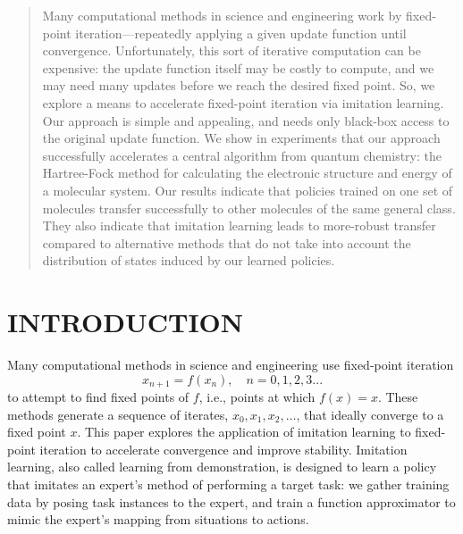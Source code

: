 \documentclass[twoside,11pt]{article}
\begin{document}
\begin{abstract}%
Many computational methods in science and engineering work by fixed-point iteration---repeatedly applying a given update function until convergence.  Unfortunately, this sort of iterative computation can be expensive: the update function itself may be costly to compute, and we may need many updates before we reach the desired fixed point.  So, we explore a means to accelerate fixed-point iteration via imitation learning.  Our approach is simple and appealing, and needs only black-box access to the original update function.  We show in experiments that our approach successfully accelerates a central algorithm from quantum chemistry: the Hartree-Fock method for calculating the electronic structure and energy of a molecular system.  Our results indicate that policies trained on one set of molecules transfer successfully to other molecules of the same general class.  They also indicate that imitation learning leads to more-robust transfer compared to alternative methods that do not take into account the distribution of states induced by our learned policies.
%
\end{abstract}

\section{INTRODUCTION}


Many computational methods in science and engineering use fixed-point iteration
\[
x_{n+1} = f(x_n), \quad n = 0,1,2,3...
\]
to attempt to find fixed points of $f$, i.e., points at which $f(x)=x$. These methods generate a sequence of iterates, $x_0, x_1, x_2, \ldots$, that ideally converge to a fixed point $x$. This paper explores the application of imitation learning to fixed-point iteration to accelerate convergence and improve stability. Imitation learning, also called learning from demonstration, is designed to learn a policy that imitates an expert's method of performing a target task: we gather training data by posing task instances to the expert, and train a function approximator to mimic the expert's mapping from situations to actions.
\end{document}

